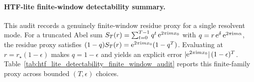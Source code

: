 \paragraph{HTF-lite finite-window detectability summary.} \AuditTag This audit records a genuinely finite-window residue proxy for a single resolvent mode. For a truncated Abel sum $S_T(r)=\sum_{t=0}^{T-1} q^t\,\mathrm{e}^{2\pi\mathrm{i} m x_0}$ with $q=r\,\mathrm{e}^\delta\,\mathrm{e}^{2\pi\mathrm{i} m\alpha}$, the residue proxy satisfies $(1-q)S_T(r)=\mathrm{e}^{2\pi\mathrm{i} m x_0}(1-q^T)$. Evaluating at $r=r_\star(1-\epsilon)$ makes $q=1-\epsilon$ and yields an explicit error $|\mathrm{e}^{2\pi\mathrm{i} m x_0}|\,(1-\epsilon)^T$. Table~\ref{tab:htf_lite_detectability_finite_window_audit} reports this finite-family proxy across bounded $(T,\epsilon)$ choices.